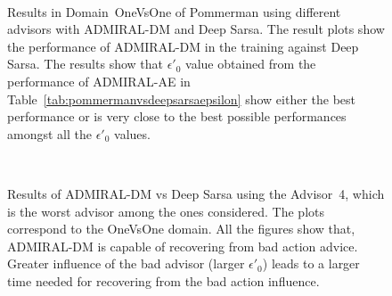 \documentclass[jair, twoside,11pt,theapa]{article}
\begin{document}
\begin{figure}[h]   
    \centering
	\\
  \caption{Results in Domain~OneVsOne of Pommerman using different advisors with ADMIRAL-DM and Deep Sarsa. The result plots show the performance of ADMIRAL-DM in the training against Deep Sarsa. The results show that $\epsilon'_0$ value obtained from the performance of ADMIRAL-AE in Table~\ref{tab:pommermanvsdeepsarsaepsilon} show either the best performance or is very close to the best possible performances amongst all the $\epsilon'_0$ values. 
  }

	\label{fig:onevsonecompetitionresults}
\end{figure}


\begin{figure}[h]
\centering
	\\

  \caption{Results of ADMIRAL-DM vs Deep Sarsa using the Advisor~4, which is the worst advisor among the ones considered. The plots correspond to the OneVsOne domain. All the figures show that, ADMIRAL-DM is capable of recovering from bad action advice.  Greater influence of the bad advisor (larger $\epsilon'_0$) leads to a larger time needed for recovering from the bad action influence. 
  }%
	\label{fig:advisor4performanceonevsone}
\end{figure}
\end{document}
